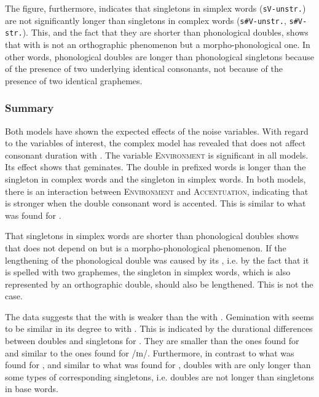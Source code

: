 \hspace*{-0.27794pt}The figure, furthermore, indicates that singletons in simplex words (\texttt{sV-unstr.}) are not significantly longer than singletons in complex words (\texttt{s\#V-unstr.}, \texttt{s\#V- str.}). This, and the fact that they are shorter than phonological doubles, shows that  with  is not an orthographic phenomenon but a morpho-phonological one. In other words, phonological doubles are longer than phonological singletons because of the presence of two underlying identical consonants, not because of the presence of two identical graphemes.



\subsubsection{Summary}

Both models have shown the expected effects of the noise variables. With regard to the variables of interest, the complex model has revealed that  does not affect consonant duration with . The variable \textsc{Environment} is significant in all models. Its effect shows that  geminates. The double in prefixed words is longer than the singleton in complex words and the singleton in simplex words. 
In both models, there is an interaction between \textsc{Environment} and \textsc{Accentuation}, indicating that  is stronger when the double consonant word is accented. This is similar to what was found for .

That singletons in simplex words are shorter than phonological doubles shows that  does not depend on  but is a {morpho-phonological phenomenon}. If the lengthening of the phonological double was caused by its , i.e. by the fact that it is spelled with two graphemes, the singleton in simplex words, which is also represented by an orthographic double, should also be lengthened. This is not the case. 


The data suggests that the  with  is weaker than the  with . Gemination with  seems to be similar in its degree to  with . 
This is indicated by the durational differences between doubles and singletons for . They are smaller than the ones found for  and similar to the ones found for /ɪn/. 
Furthermore, in contrast to what was found for , and similar to what was found for , doubles with  are only longer than some types of corresponding singletons, i.e. doubles are not longer than singletons in base words.



